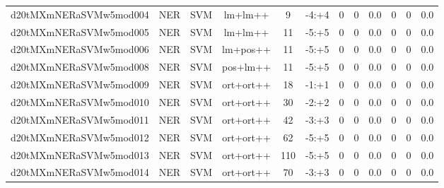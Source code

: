 \documentclass[a4paper]{article}
\begin{document}
\begin{landscape}
\begin{center}
\begin{tabular}{ |c|c|c|c|c|c|c|c|c|c|c|c|}
 
 	
 	\small{ d20tMXmNERaSVMw5mod004 } & \small{ NER} & \small{  SVM }  & lm+lm++  &  9 &  \small{  -4:+4 }  &  0 & 0 & 0.0  &  0 & 0 & 0.0 \\
 	

 
 	
 	\small{ d20tMXmNERaSVMw5mod005 } & \small{ NER} & \small{  SVM }  & lm+lm++  &  11 &  \small{  -5:+5 }  &  0 & 0 & 0.0  &  0 & 0 & 0.0 \\
 	

 
 	
 	\small{ d20tMXmNERaSVMw5mod006 } & \small{ NER} & \small{  SVM }  & lm+pos++  &  11 &  \small{  -5:+5 }  &  0 & 0 & 0.0  &  0 & 0 & 0.0 \\
 	

 
 	
 	\small{ d20tMXmNERaSVMw5mod008 } & \small{ NER} & \small{  SVM }  & pos+lm++  &  11 &  \small{  -5:+5 }  &  0 & 0 & 0.0  &  0 & 0 & 0.0 \\
 	

 
 	
 	\small{ d20tMXmNERaSVMw5mod009 } & \small{ NER} & \small{  SVM }  & ort+ort++  &  18 &  \small{  -1:+1 }  &  0 & 0 & 0.0  &  0 & 0 & 0.0 \\
 	

 
 	
 	\small{ d20tMXmNERaSVMw5mod010 } & \small{ NER} & \small{  SVM }  & ort+ort++  &  30 &  \small{  -2:+2 }  &  0 & 0 & 0.0  &  0 & 0 & 0.0 \\
 	

 
 	
 	\small{ d20tMXmNERaSVMw5mod011 } & \small{ NER} & \small{  SVM }  & ort+ort++  &  42 &  \small{  -3:+3 }  &  0 & 0 & 0.0  &  0 & 0 & 0.0 \\
 	

 
 	
 	\small{ d20tMXmNERaSVMw5mod012 } & \small{ NER} & \small{  SVM }  & ort+ort++  &  62 &  \small{  -5:+5 }  &  0 & 0 & 0.0  &  0 & 0 & 0.0 \\
 	

 
 	
 	\small{ d20tMXmNERaSVMw5mod013 } & \small{ NER} & \small{  SVM }  & ort+ort++  &  110 &  \small{  -5:+5 }  &  0 & 0 & 0.0  &  0 & 0 & 0.0 \\
 	

 
 	
 	\small{ d20tMXmNERaSVMw5mod014 } & \small{ NER} & \small{  SVM }  & ort+ort++  &  70 &  \small{  -3:+3 }  &  0 & 0 & 0.0  &  0 & 0 & 0.0 \\
 	


\end{tabular}
\end{center}
\end{landscape}
\end{document}
